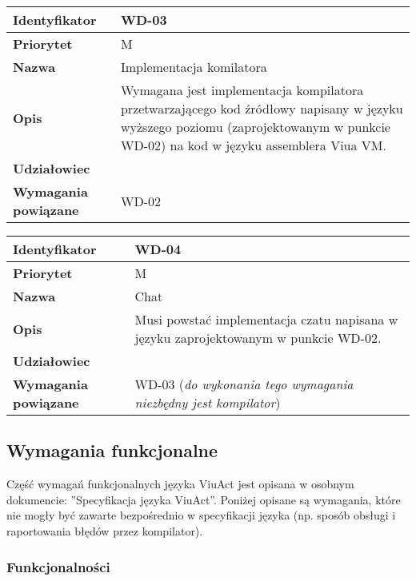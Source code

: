 \documentclass[11pt,oneside,a4paper,titlepage,onecolumn]{article}
\begin{document}
\vspace{1em}

\begin{tabular}{ | l | l | }
    \hline
    \textbf{Identyfikator} & \parbox[t]{11cm}{WD-03} \\
    \hline
    \textbf{Priorytet} & M \\
    \hline
    \textbf{Nazwa} & Implementacja komilatora \\
    \hline
    \textbf{Opis} & \parbox[t]{11cm}{
        Wymagana jest implementacja kompilatora przetwarzającego kod źródłowy napisany w języku
        wyższego poziomu (zaprojektowanym w punkcie WD-02) na kod w języku assemblera Viua VM.
    } \\
    \hline
    \textbf{Udziałowiec} & \phantom{} \\
    \hline
    \textbf{Wymagania powiązane} & WD-02 \\
    \hline
\end{tabular}

\vspace{1em}

\begin{tabular}{ | l | l | }
    \hline
    \textbf{Identyfikator} & \parbox[t]{11cm}{WD-04} \\
    \hline
    \textbf{Priorytet} & M \\
    \hline
    \textbf{Nazwa} & Chat \\
    \hline
    \textbf{Opis} & \parbox[t]{11cm}{
        Musi powstać implementacja czatu napisana w języku zaprojektowanym w punkcie WD-02.
    } \\
    \hline
    \textbf{Udziałowiec} & \phantom{} \\
    \hline
    \textbf{Wymagania powiązane} & \parbox[t]{11cm}{
        WD-03 (\emph{do wykonania tego wymagania niezbędny jest kompilator})
    } \\
    \hline
\end{tabular}

\subsection{Wymagania funkcjonalne}

Część wymagań funkcjonalnych języka ViuAct jest opisana w osobnym dokumencie: ''Specyfikacja języka ViuAct''.
Poniżej opisane są wymagania, które nie mogły być zawarte bezpośrednio w specyfikacji języka (np. sposób
obsługi i raportowania błędów przez kompilator).

\subsubsection{Funkcjonalności}
\end{document}
